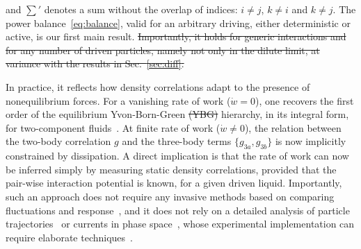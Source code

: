 \documentclass[superscriptaddress, twocolumn, prx, longbibliography, nofootinbib]{revtex4-1}
\providecommand{\DIFdeltex}[1]{{\protect\color{red}\sout{#1}}}                      %
\providecommand{\DIFdelbegin}{} %
\providecommand{\DIFdelend}{} %
\providecommand{\DIFdel}[1]{\texorpdfstring{\DIFdeltex{#1}}{}} %
\begin{document}
and $\sum'$ denotes a sum without the overlap of indices: $i\neq j$, $k\neq i$ and $k\neq j$. The power balance~\eqref{eq:balance}, valid for an arbitrary driving, either deterministic or active, is our first main result.
\DIFdelbegin \DIFdel{Importantly, it holds for generic interactions and for any number of driven particles, namely not only in the dilute limit, at variance with the results in Sec.~\ref{sec:diff}.
}\DIFdelend 


In practice, it reflects how density correlations adapt to the presence of nonequilibrium forces. For a vanishing rate of work ($\dot w = 0$), one recovers the first order of the equilibrium Yvon-Born-Green \DIFdelbegin \DIFdel{(YBG) }\DIFdelend hierarchy, in its integral form, for two-component fluids~\cite{Hansen2013}. At finite rate of work ($\dot w\neq0$), the relation between the two-body correlation $g$ and the three-body terms $\{g_{3a},g_{3b}\}$ is now implicitly constrained by dissipation. A direct implication is that the rate of work can now be inferred simply by measuring static density correlations, provided that the pair-wise interaction potential is known, for a given driven liquid. Importantly, such an approach does not require any invasive methods based on comparing fluctuations and response~\cite{Harada2005, Mizuno2007, Visco2015, Turlier2016, Ahmed2018}, and it does not rely on a detailed analysis of particle trajectories~\cite{Roldan2018, Parrondo2018} or currents in phase space~\cite{Gingrich2017, Li2018}, whose experimental implementation can require elaborate techniques~\cite{Battle604, Mura2018}.
\end{document}
